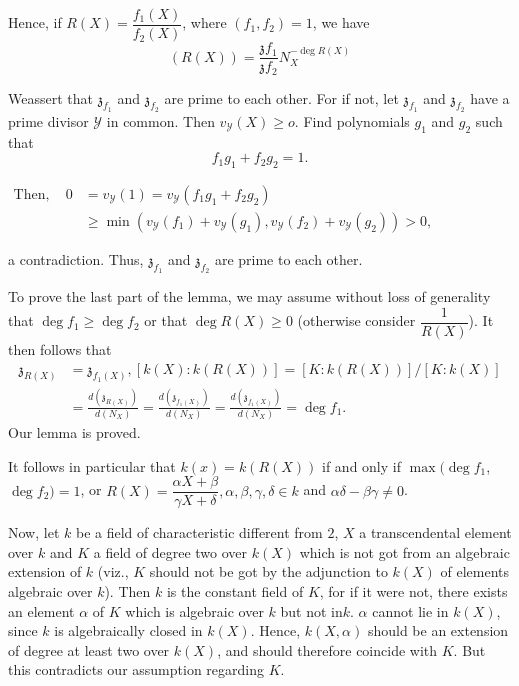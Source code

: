 Hence, if $R(X) = \dfrac{f_1 (X)}{f_2 (X)}$, where $(f_1, f_2)  =1$, we have 
$$
(R(X)) = \frac{\mathfrak{z}f_1}{\mathfrak{z}f_2} N_{X}^{-\deg R(X)}
$$

We\pageoriginale assert that $\mathfrak{z}_{f_1}$ and $\mathfrak{z}_{f_2}$ are prime
to each other. For if not, let $\mathfrak{z}_{f_1}$ and
$\mathfrak{z}_{f_2}$ have a prime divisor $\mathscr{Y}$ in
common. Then $v_{\mathscr{Y}} (X) \ge o$. Find polynomials $g_1$ and
$g_2$ such that 
$$
f_1 g_1 + f_2 g_2 = 1.
$$

$\begin{aligned}
\text{Then}, \quad 
  0 &= v_{\mathscr{Y}}(1) = v_{\mathscr{Y}} (f_1 g_1 + f_2 g_2)\\
& \ge \min (v_{\mathscr{Y}} (f_1) + v_{\mathscr{Y}}(g_1),
v_{\mathscr{Y}} (f_2) + v_{\mathscr{Y}} (g_2)) > 0,
\end{aligned}$

a contradiction. Thus, $\mathfrak{z}_{f_1}$ and $\mathfrak{z}_{f_2}$
are prime to each other. 

To prove the last part of the lemma, we may assume without loss of
generality that $\deg f_1 \ge \deg f_2$ or that $\deg R(X) \ge 0$
(otherwise consider $\dfrac{1}{R(X)}$). It then follows that 
\begin{align*}
  \mathfrak{z}_{R(X)} & = \mathfrak{z}_{f_1 (X)}, [k(X) : k(R(X))] = [K :
    k(R(X))] / [K : k(X)]\\ 
  & = \frac{d(\mathfrak{z}_{R(X)})}{d (N_{X})} = \frac{d
  (\mathfrak{z}_{f_1 (X)})} {d(N_{X})} = \frac{d
  (\mathfrak{z}_{f_1 (X)})} {d(N_{X})} = \deg f_1. 
\end{align*}
Our lemma is proved.

It follows in particular that $k(x) = k(R(X))$ if and only if $\max
(\deg f_1$, $\deg f_2) = 1$, or $R(X) = \dfrac{\alpha X + \beta} {\gamma
  X + \delta }, \alpha, \beta, \gamma, \delta \in k$ and $\alpha
\delta - \beta \gamma \neq 0$. 

Now, let $k$ be a field of characteristic different from $2$, $X$ a
transcendental element over $k$ and $K$ a field of degree two over
$k(X)$ which is not got from an algebraic extension of $k$ (viz., $K$
should not be got by the adjunction to $ k(X)$ of elements algebraic
over $k$). Then $k$ is the constant field of $K$, for if it were not,
there exists an element $\alpha $ of $K$ which is algebraic over $k$
but not in\pageoriginale $k$. $\alpha$ cannot lie in $k(X)$, since $k$ is
algebraically closed in $k(X)$. Hence, $k(X, \alpha)$ should be an
extension of degree at least two over $k(X)$, and should therefore
coincide with $K$. But this contradicts our assumption regarding $K$. 

